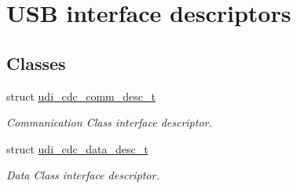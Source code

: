 \hypertarget{group__udi__cdc__group__desc}{\section{U\-S\-B interface descriptors}
\label{group__udi__cdc__group__desc}
}
\subsection*{Classes}
\begin{DoxyCompactItemize}
\item 
struct \hyperlink{structudi__cdc__comm__desc__t}{udi\-\_\-cdc\-\_\-comm\-\_\-desc\-\_\-t}
\begin{DoxyCompactList}\small\item\em Communication Class interface descriptor. \end{DoxyCompactList}\item 
struct \hyperlink{structudi__cdc__data__desc__t}{udi\-\_\-cdc\-\_\-data\-\_\-desc\-\_\-t}
\begin{DoxyCompactList}\small\item\em Data Class interface descriptor. \end{DoxyCompactList}\end{DoxyCompactItemize}
